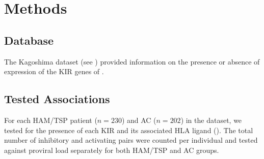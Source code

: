 \section{Methods}

\subsection{Database}

The Kagoshima dataset (see ) provided information on the presence or absence of expression of the KIR genes of .

\subsection{Tested Associations}

For each HAM/TSP patient ($n = 230$) and AC ($n = 202$) in the dataset, we tested for the presence of each KIR and its associated HLA ligand (). The total number of inhibitory and activating pairs were counted per individual and tested against proviral load separately for both HAM/TSP and AC groups.

